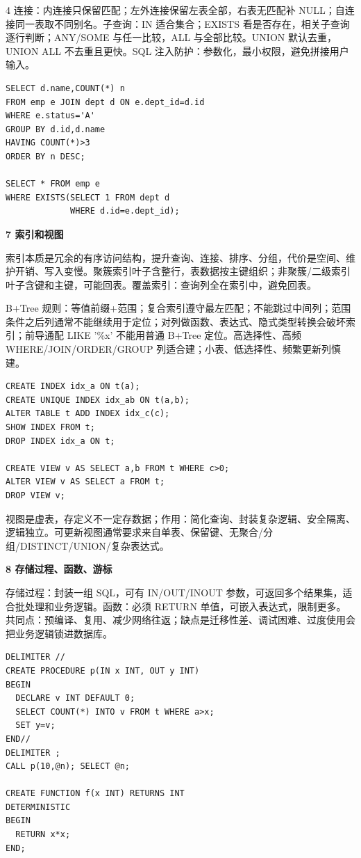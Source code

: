 \documentclass[UTF8]{ctexart}
\newcommand{\blk}[1]{\vspace{0.8pt}\noindent\colorbox{black!10}{\parbox{\dimexpr\linewidth-2\fboxsep}{\bfseries #1}}\vspace{0.6pt}}
\begin{document}
\begin{multicols*}{4}
连接：内连接只保留匹配；左外连接保留左表全部，右表无匹配补 NULL；自连接同一表取不同别名。子查询：IN 适合集合；EXISTS 看是否存在，相关子查询逐行判断；ANY/SOME 与任一比较，ALL 与全部比较。UNION 默认去重，UNION ALL 不去重且更快。SQL 注入防护：参数化，最小权限，避免拼接用户输入。

\begin{lstlisting}
SELECT d.name,COUNT(*) n
FROM emp e JOIN dept d ON e.dept_id=d.id
WHERE e.status='A'
GROUP BY d.id,d.name
HAVING COUNT(*)>3
ORDER BY n DESC;

SELECT * FROM emp e
WHERE EXISTS(SELECT 1 FROM dept d
             WHERE d.id=e.dept_id);
\end{lstlisting}

\blk{7 索引和视图}
索引本质是冗余的有序访问结构，提升查询、连接、排序、分组，代价是空间、维护开销、写入变慢。聚簇索引叶子含整行，表数据按主键组织；非聚簇/二级索引叶子含键和主键，可能回表。覆盖索引：查询列全在索引中，避免回表。

B+Tree 规则：等值前缀+范围；复合索引遵守最左匹配；不能跳过中间列；范围条件之后列通常不能继续用于定位；对列做函数、表达式、隐式类型转换会破坏索引；前导通配 LIKE '\%x' 不能用普通 B+Tree 定位。高选择性、高频 WHERE/JOIN/ORDER/GROUP 列适合建；小表、低选择性、频繁更新列慎建。

\begin{lstlisting}
CREATE INDEX idx_a ON t(a);
CREATE UNIQUE INDEX idx_ab ON t(a,b);
ALTER TABLE t ADD INDEX idx_c(c);
SHOW INDEX FROM t;
DROP INDEX idx_a ON t;

CREATE VIEW v AS SELECT a,b FROM t WHERE c>0;
ALTER VIEW v AS SELECT a FROM t;
DROP VIEW v;
\end{lstlisting}
视图是虚表，存定义不一定存数据；作用：简化查询、封装复杂逻辑、安全隔离、逻辑独立。可更新视图通常要求来自单表、保留键、无聚合/分组/DISTINCT/UNION/复杂表达式。
\blk{8 存储过程、函数、游标}
存储过程：封装一组 SQL，可有 IN/OUT/INOUT 参数，可返回多个结果集，适合批处理和业务逻辑。函数：必须 RETURN 单值，可嵌入表达式，限制更多。共同点：预编译、复用、减少网络往返；缺点是迁移性差、调试困难、过度使用会把业务逻辑锁进数据库。

\begin{lstlisting}
DELIMITER //
CREATE PROCEDURE p(IN x INT, OUT y INT)
BEGIN
  DECLARE v INT DEFAULT 0;
  SELECT COUNT(*) INTO v FROM t WHERE a>x;
  SET y=v;
END//
DELIMITER ;
CALL p(10,@n); SELECT @n;

CREATE FUNCTION f(x INT) RETURNS INT
DETERMINISTIC
BEGIN
  RETURN x*x;
END;
\end{lstlisting}


\end{multicols*}
\end{document}
